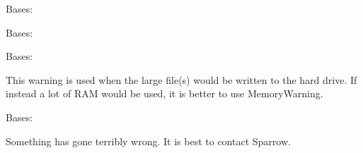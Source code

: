 \documentclass[letterpaper,10pt,english]{sphinxmanual}
\begin{document}
\begin{fulllineitems}
\label{\detokenize{python_docstrings/IfA_Smeargle.meta.errors:IfA_Smeargle.meta.errors.Smeargle_Exception}}
Bases: 

\end{fulllineitems}


\begin{fulllineitems}
\label{\detokenize{python_docstrings/IfA_Smeargle.meta.errors:IfA_Smeargle.meta.errors.Smeargle_Warning}}
Bases: 

\end{fulllineitems}


\begin{fulllineitems}
\label{\detokenize{python_docstrings/IfA_Smeargle.meta.errors:IfA_Smeargle.meta.errors.StorageWarning}}
Bases: {\hyperref[\detokenize{python_docstrings/IfA_Smeargle.meta.errors:IfA_Smeargle.meta.errors.Smeargle_Warning}]{}}

This warning is used when the large file(s) would be written to the hard
drive. If instead a lot of RAM would be used, it is better to use
MemoryWarning.

\end{fulllineitems}


\begin{fulllineitems}
\label{\detokenize{python_docstrings/IfA_Smeargle.meta.errors:IfA_Smeargle.meta.errors.TerminalError}}
Bases: {\hyperref[\detokenize{python_docstrings/IfA_Smeargle.meta.errors:IfA_Smeargle.meta.errors.Smeargle_BaseException}]{}}

Something has gone terribly wrong. It is best to contact Sparrow.

\end{fulllineitems}
\end{document}

